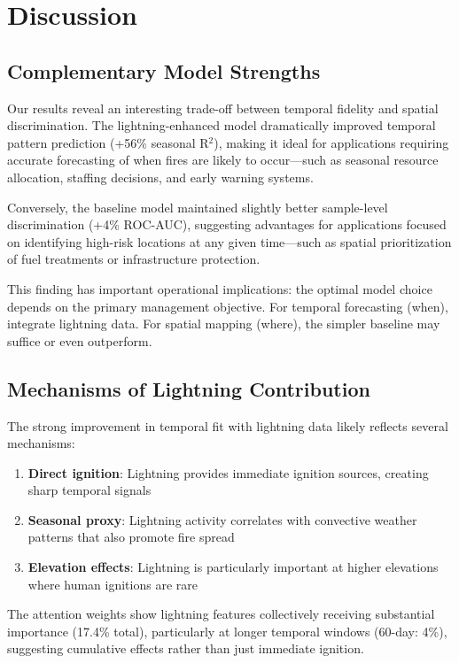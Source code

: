 \documentclass[11pt,a4paper]{article}
\begin{document}
\section{Discussion}

\subsection{Complementary Model Strengths}

Our results reveal an interesting trade-off between temporal fidelity and spatial discrimination. The lightning-enhanced model dramatically improved temporal pattern prediction (+56\% seasonal R$^2$), making it ideal for applications requiring accurate forecasting of when fires are likely to occur---such as seasonal resource allocation, staffing decisions, and early warning systems.

Conversely, the baseline model maintained slightly better sample-level discrimination (+4\% ROC-AUC), suggesting advantages for applications focused on identifying high-risk locations at any given time---such as spatial prioritization of fuel treatments or infrastructure protection.

This finding has important operational implications: the optimal model choice depends on the primary management objective. For temporal forecasting (when), integrate lightning data. For spatial mapping (where), the simpler baseline may suffice or even outperform.

\subsection{Mechanisms of Lightning Contribution}

The strong improvement in temporal fit with lightning data likely reflects several mechanisms:

\begin{enumerate}
    \item \textbf{Direct ignition}: Lightning provides immediate ignition sources, creating sharp temporal signals
    \item \textbf{Seasonal proxy}: Lightning activity correlates with convective weather patterns that also promote fire spread
    \item \textbf{Elevation effects}: Lightning is particularly important at higher elevations where human ignitions are rare
\end{enumerate}

The attention weights show lightning features collectively receiving substantial importance (17.4\% total), particularly at longer temporal windows (60-day: 4\%), suggesting cumulative effects rather than just immediate ignition.
\end{document}
